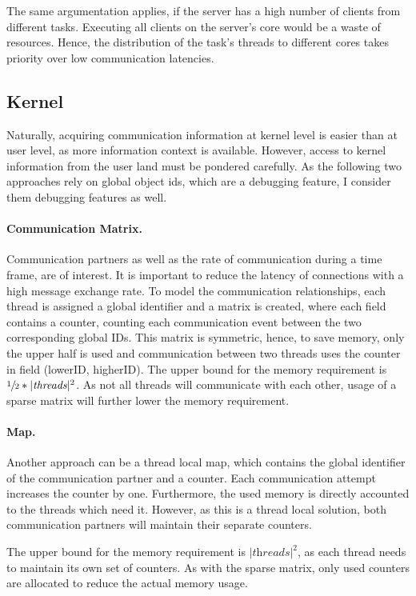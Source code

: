 The same argumentation applies, if the server has a high number of clients from
different tasks.
Executing all clients on the server's core would be a waste of resources.
Hence, the distribution of the task's threads to different cores takes priority
over low communication latencies.


\subsection{Kernel}
Naturally, acquiring communication information at kernel level is easier than
at user level, as more information context is available.
However, access to kernel information from the user land must be pondered carefully.
As the following two approaches rely on global object ids, which are a debugging
feature, I consider them debugging features as well.


\paragraph{Communication Matrix.}
Communication partners as well as the rate of communication during a time
frame, are of interest.
It is important to reduce the latency of connections with a high message
exchange rate.
To model the communication relationships, each thread is assigned a global
identifier and a matrix is created, where each field contains a counter,
counting each communication event between the two corresponding global IDs.
This matrix is symmetric, hence, to save memory, only the upper half is used
and communication between two threads uses the counter in field
(lowerID, higherID).
The upper bound for the memory requirement is $\sfrac{1}{2} * |\textit{threads}|^2$.
As not all threads will communicate with each other, usage of a sparse matrix
will further lower the memory requirement.

\paragraph{Map.}
Another approach can be a thread local map, which contains the global
identifier of the communication partner and a counter.
Each communication attempt increases the counter by one.
Furthermore, the used memory is directly accounted to the threads which need it.
However, as this is a thread local solution, both communication partners will
maintain their separate counters.

The upper bound for the memory requirement is $|\textit{threads}|^2$, as each thread
needs to maintain its own set of counters.
As with the sparse matrix, only used counters are allocated to reduce the
actual memory usage.
\\

